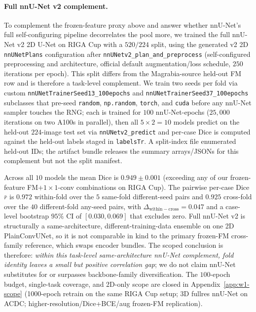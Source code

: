 \paragraph{Full nnU-Net v2 complement.} To complement the frozen-feature proxy above and answer whether nnU-Net's full self-configuring pipeline decorrelates the pool more, we trained the full nnU-Net v2 2D U-Net on RIGA Cup with a $520/224$ split, using the generated v2 2D \texttt{nnUNetPlans} configuration after \texttt{nnUNetv2\_plan\_and\_preprocess} (self-configured preprocessing and architecture, official default augmentation/loss schedule, $250$ iterations per epoch). This split differs from the Magrabia-source held-out FM row and is therefore a task-level complement. We train two seeds per fold via custom \texttt{nnUNetTrainerSeed13\_100epochs} and \texttt{nnUNetTrainerSeed37\_100epochs} subclasses that pre-seed \texttt{random}, \texttt{np.random}, \texttt{torch}, and \texttt{cuda} before any nnU-Net sampler touches the RNG; each is trained for $100$ nnU-Net-epochs ($25{,}000$ iterations on two A100s in parallel), then all $5\times 2{=}10$ models predict on the held-out $224$-image test set via \texttt{nnUNetv2\_predict} and per-case Dice is computed against the held-out labels staged in \texttt{labelsTr}. A split-index file enumerated held-out IDs; the artifact bundle releases the summary arrays/JSONs for this complement but not the split manifest.

Across all $10$ models the mean Dice is $0.949\pm 0.001$ (exceeding any of our frozen-feature FM$+1{\times}1$-conv combinations on RIGA Cup). The pairwise per-case Dice $\bar{r}$ is $0.972$ within-fold over the $5$ same-fold different-seed pairs and $0.925$ cross-fold over the $40$ different-fold any-seed pairs, with $\Delta_{\mathrm{within-cross}}{=}0.047$ and a case-level bootstrap $95\%$ CI of $[0.030, 0.069]$ that excludes zero. Full nnU-Net v2 is structurally a same-architecture, different-training-data ensemble on one 2D PlainConvUNet, so it is not comparable in kind to the primary frozen-FM cross-family reference, which swaps encoder bundles. The scoped conclusion is therefore: \emph{within this task-level same-architecture nnU-Net complement, fold identity leaves a small but positive correlation gap}; we do not claim nnU-Net substitutes for or surpasses backbone-family diversification. The $100$-epoch budget, single-task coverage, and 2D-only scope are closed in Appendix~\ref{app:w1-scope} (1000-epoch retrain on the same RIGA Cup setup; 3D fullres nnU-Net on ACDC; higher-resolution/Dice+BCE/aug frozen-FM replication).

